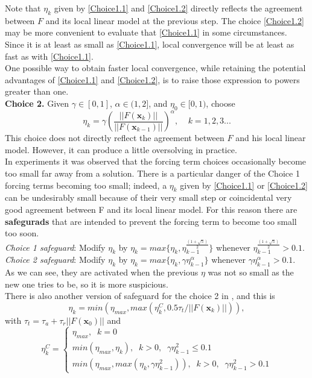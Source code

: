  Note that $\eta_k$ given by \eqref{Choice1.1} and \eqref{Choice1.2} directly reflects the agreement between $F$ and its local linear model at the previous step. The choice \eqref{Choice1.2} may be more convenient to evaluate that \eqref{Choice1.1} in some circumstances. Since it is at least as small as \eqref{Choice1.1}, local convergence will be at least as fast as with \eqref{Choice1.1}.\\
 One possible way to obtain faster local convergence, while retaining the potential advantages of \eqref{Choice1.1} and \eqref{Choice1.2}, is to raise those expression to powers greater than one. \\
\noindent \textbf{Choice 2.} Given $\gamma \in [0,1]$, $\alpha \in (1,2]$, and $\eta_0 \in [0,1)$, choose
\begin{equation}
\eta_k=\gamma \left(\frac{||F(\textbf{x}_k)||}{||F(\textbf{x}_{k-1})||}\right)^{\alpha},\;\;\;\; k=1,2,3...
\label{Choice2}
\end{equation}
This choice does not directly reflect the agreement between $F$ and his local linear model. However, it can produce a little oversolving in practice.\\ 

In experiments it was observed that the forcing term choices occasionally become too small far away from a solution. There is a particular danger of the Choice 1 forcing terms becoming too small; indeed, a $\eta_k$ given by \eqref{Choice1.1} or \eqref{Choice1.2} can be undesirably small because of their very small step or coincidental very good agreement between F and its local linear model. For this reason there are \textbf{safegurads} that are intended to prevent the forcing term to become too small too soon.\\
\textit{Choice 1 safeguard}: Modify $\eta_k$ by $\eta_k = max  \{\eta_k, \eta_{k-1}^{\frac{(1+\sqrt{5})}{2}}\}$ whenever $\eta_{k-1}^\frac{(1+\sqrt{5})}{2} > 0.1$.\\
\textit{Choice 2 safeguard}: Modify $\eta_k$ by $\eta_k = max  \{\eta_k,\gamma  \eta_{k-1}^\alpha\}$ 
whenever $\gamma  \eta_{k-1}^\alpha > 0.1$.\\
As we can see, they are activated when the previous $ \eta $ was not so small as the new one tries to be, so it is more suspicious. \\
There is also another version of safeguard for the choice 2 in \cite{Kelley1}, and this is 
\begin{equation*}
\eta_k = min (\eta_{max}, max (\eta_k^C, 0.5 \tau_t/||F(\textbf{x}_k)||)),
\end{equation*}
with $\tau_t =  \tau_a + \tau_r||F(\textbf{x}_0)||$ and 
\begin{equation*}
\eta_k^C={
\begin{cases}
\eta_{max},\;\; k=0 \\
min(\eta_{max}, \eta_k),\;\; k>0,\;\; \gamma \eta_{k-1}^2\leq 0.1\\
min(\eta_{max}, max(\eta_k, \gamma \eta_{k-1}^2)),\;\; k>0,\;\; \gamma \eta_{k-1}^2> 0.1

\end{cases}}
\end{equation*}

